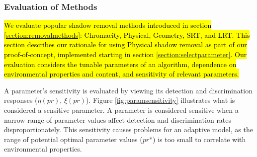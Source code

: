 \documentclass[12pt]{report}
\begin{document}
\subsubsection{Evaluation of Methods}

\hl{We evaluate popular shadow removal methods introduced in section \ref{section:removalmethods}: Chromacity, Physical, Geometry, SRT, and LRT. This section describes our rationale for using Physical shadow removal as part of our proof-of-concept, implemented starting in section \ref{section:selectparameter}. Our evaluation considers the tunable parameters of an algorithm, dependence on environmental properties and content, and sensitivity of relevant parameters.}

A parameter's sensitivity is evaluated by viewing its detection and discrimination responses ($\eta(pr)$, $\xi(pr)$). Figure \ref{fig:paramsensitivity} illustrates what is considered a sensitive parameter. A parameter is considered sensitive when a narrow range of parameter values affect detection and discrimination rates disproportionately. This sensitivity causes problems for an adaptive model, as the range of potential optimal parameter values ($pr$*) is too small to correlate with environmental properties. 
\end{document}

